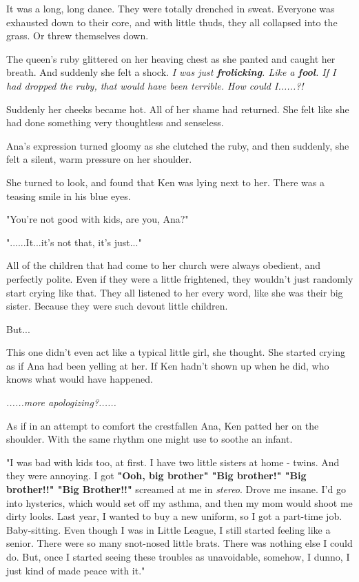 \documentclass[
]{article}
\begin{document}
It was a long, long dance. They were totally drenched in sweat. Everyone
was exhausted down to their core, and with little thuds, they all
collapsed into the grass. Or threw themselves down.

The queen's ruby glittered on her heaving chest as she panted and caught
her breath. And suddenly she felt a shock. \emph{I was just
\textbf{frolicking}. Like a \textbf{fool}. If I had dropped the ruby,
that would have been terrible. How could I......?!}

Suddenly her cheeks became hot. All of her shame had returned. She felt
like she had done something very thoughtless and senseless.

Ana's expression turned gloomy as she clutched the ruby, and then
suddenly, she felt a silent, warm pressure on her shoulder.

She turned to look, and found that Ken was lying next to her. There was
a teasing smile in his blue eyes.

"You're not good with kids, are you, Ana?"

"......It...it's not that, it's just..."

All of the children that had come to her church were always obedient,
and perfectly polite. Even if they were a little frightened, they
wouldn't just randomly start crying like that. They all listened to her
every word, like she was their big sister. Because they were such devout
little children.

But...

This one didn't even act like a typical little girl, she thought. She
started crying as if Ana had been yelling at her. If Ken hadn't shown up
when he did, who knows what would have happened.

\emph{......more apologizing?......}

As if in an attempt to comfort the crestfallen Ana, Ken patted her on
the shoulder. With the same rhythm one might use to soothe an infant.

"I was bad with kids too, at first. I have two little sisters at home -
twins. And they were annoying. I got \textbf{"Ooh, big brother" "Big
brother!" "Big brother!!" "Big Brother!!"} screamed at me in
\emph{stereo}. Drove me insane. I'd go into hysterics, which would set
off my asthma, and then my mom would shoot me dirty looks. Last year, I
wanted to buy a new uniform, so I got a part-time job. Baby-sitting.
Even though I was in Little League, I still started feeling like a
senior. There were so many snot-nosed little brats. There was nothing
else I could do. But, once I started seeing these troubles as
unavoidable, somehow, I dunno, I just kind of made peace with it."
\end{document}

